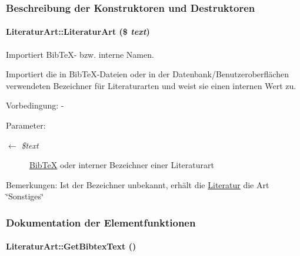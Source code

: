 \subsubsection{Beschreibung der Konstruktoren und Destruktoren}
\hypertarget{classLiteraturArt_b3312217430531ed7821a46a39c49af7}{
\paragraph[LiteraturArt]{\setlength{\rightskip}{0pt plus 5cm}Literatur\-Art::Literatur\-Art (\$ {\em text})}\hfill}
\label{classLiteraturArt_b3312217430531ed7821a46a39c49af7}


Importiert Bib\-Te\-X- bzw. interne Namen. 

Importiert die in Bib\-Te\-X-Dateien oder in der Datenbank/Benutzeroberflächen verwendeten Bezeichner für Literaturarten und weist sie einen internen Wert zu. \begin{Desc}
\item[Vorbedingung:]- \end{Desc}
\begin{Desc}
\item[Parameter:]
\begin{description}
\item[\mbox{$\leftarrow$} {\em \$text}]\hyperlink{classBibTeX}{Bib\-Te\-X} oder interner Bezeichner einer Literaturart \end{description}
\end{Desc}
\begin{Desc}
\item[Bemerkungen:]Ist der Bezeichner unbekannt, erhält die \hyperlink{classLiteratur}{Literatur} die Art \char`\"{}Sonstiges\char`\"{} \end{Desc}


\subsubsection{Dokumentation der Elementfunktionen}
\hypertarget{classLiteraturArt_01e1a2acd95df1ae0bb22e57b70a63de}{
\paragraph[GetBibtexText]{\setlength{\rightskip}{0pt plus 5cm}Literatur\-Art::Get\-Bibtex\-Text ()}\hfill}
\label{classLiteraturArt_01e1a2acd95df1ae0bb22e57b70a63de}



